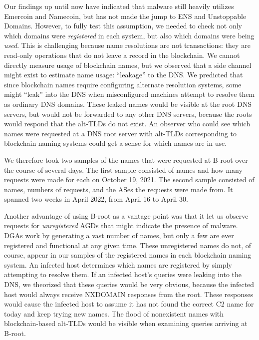 Our findings up until now have indicated that
malware still heavily utilizes Emercoin and Namecoin, but has 
not made the jump to ENS and Unstoppable Domains. However, to fully test this 
assumption, we needed to check not only which domains were \emph{registered} in 
each system, but also which domains were being \emph{used}. 
This is challenging because name resolutions are not 
transactions: they are read-only operations that do not leave 
a record in the blockchain. We cannot directly measure 
usage of blockchain names, but we observed that a side 
channel might exist to estimate name usage: ``leakage'' to the DNS. We 
predicted that since blockchain names require configuring alternate resolution 
systems, some might ``leak'' into the DNS when misconfigured machines 
attempt to resolve them as ordinary DNS domains. These leaked 
names would be visible at the root DNS servers, but would not 
be forwarded to any other DNS servers, because the roots 
would respond that the alt-TLDs do not exist. An observer who could see which 
names were requested at a DNS root server with alt-TLDs corresponding to 
blockchain naming systems could get a sense for which names are in use.

We therefore took two samples of the names that were 
requested at B-root over the course of several days. The first sample consisted 
of names and how many requests were made for each on October 19, 2021. 
The second sample consisted of names, numbers of requests, and the ASes the 
requests were made from. It spanned two weeks in April 2022, from April 16 to 
April 30. 

%
Another advantage of using B-root as a vantage point was 
that it let us observe requests for \emph{unregistered} AGDs that 
might indicate the presence of malware. DGAs work by generating a vast number 
of names, but only a few are ever registered and functional at any given time. 
These unregistered names do not, of course, appear in our samples of the 
registered names in each blockchain naming system. An infected host determines 
which names are registered by simply attempting to resolve them. If an infected 
host's queries were leaking into the DNS, we theorized that these queries would 
be very obvious, because the infected host would always receive NXDOMAIN 
responses from the root. These responses would cause the infected host to 
assume it has not 
found the correct C2 name for today and keep trying new 
names. The flood of nonexistent names with blockchain-based 
alt-TLDs would be visible when examining queries arriving at B-root. 

